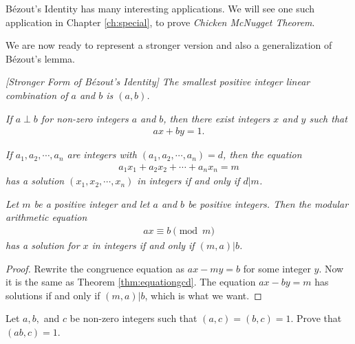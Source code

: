 \documentclass{subfile}
\begin{document}
	B\'{e}zout's Identity has many interesting applications. We will see one such application in Chapter \ref{ch:special}, to prove \textit{Chicken McNugget Theorem}. 
	
	We are now ready to represent a stronger version and also a generalization of B\'{e}zout's lemma.
	
	\begin{corollary} \slshape  [Stronger Form of B\'{e}zout's Identity]\label{cor:strongbezout}
		The smallest positive integer linear combination of $a$ and $b$ is $(a,b)$.
	\end{corollary}
	
	\begin{corollary} \slshape \label{cor:bezoutcoprime}
		If $a \perp b$ for non-zero integers $a$ and $b$, then there exist integers $x$ and $y$ such that
		\begin{align*}
		ax+by=1.
		\end{align*}
	\end{corollary}
	
	\begin{theorem}  \slshape 
		If $a_1, a_2, \cdots, a_n$ are integers with $(a_1, a_2, \cdots, a_n)=d$, then the equation
		\begin{align*}
		a_1x_1 + a_2x_2 + \cdots + a_n x_n = m
		\end{align*}
		has a solution $(x_1, x_2, \cdots, x_n)$ in integers if and only if $d|m$.
	\end{theorem}
	
	\begin{theorem}\slshape\label{thm:ax=b}
		Let $m$ be a positive integer and let $a$ and $b$ be positive integers. Then the modular arithmetic equation
		\begin{align*} ax \equiv b \pmod m\end{align*}
		has a solution for $x$ in integers if and only if $(m,a)|b$.
	\end{theorem}
	
	\begin{proof}
		Rewrite the congruence equation as $ax-my = b$ for some integer $y$. Now it is the same as Theorem \ref{thm:equationgcd}. The equation $ax-by=m$ has solutions if and only if $(m,a)|b$, which is what we want.
	\end{proof}
	
	\begin{problem}
		Let $a,b,$ and $c$ be non-zero integers such that $(a, c)=(b,c)=1$. Prove that $(ab,c)=1$.
	\end{problem}
	
\end{document}
